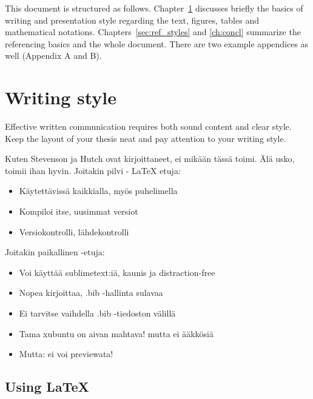 \documentclass[12pt,a4paper,finnish]{tutthesis}
\begin{document}
This document is structured as follows. Chapter~\ref{ch:style}
discusses briefly the basics of writing and presentation style
regarding the text, figures, tables and mathematical
notations. Chapters~\ref{sec:ref_styles} and \ref{ch:concl} summarize
the referencing basics and the whole document. There are two example
appendices as well (Appendix A and B).



\chapter{Writing style}
\label{ch:style}

Effective written communication requires both sound content and clear
style. Keep the layout of your thesis neat and pay attention to your
writing style.

Kuten Stevenson ja Hutch \parencite{rubberwheel} ovat kirjoittaneet,
ei mikään tässä toimi. Älä usko, toimii ihan hyvin. Joitakin pilvi - \LaTeX
etuja:
\begin{itemize}
\item Käytettävissä kaikkialla, myös puhelimella
\item Kompiloi itse, uusimmat versiot
\item Versiokontrolli, lähdekontrolli
\end{itemize}

Joitakin paikallinen \LaTeXe -etuja:
\begin{itemize}
\item Voi käyttää sublimetext:iä, kaunis ja distraction-free
\item Nopea kirjoittaa, .bib -hallinta sulavaa
\item Ei tarvitse vaihdella .bib -tiedoston välillä
\item Tama xubuntu on aivan mahtava! mutta ei \"a\"akk\"osi\"a
\item Mutta: ei voi previewata!
\end{itemize}
\section{Using LaTeX}
\end{document}
